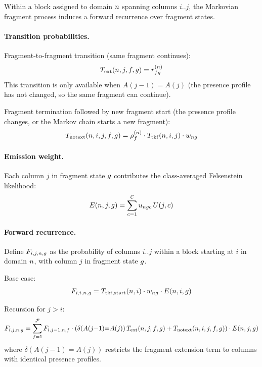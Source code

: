 Within a block assigned to domain $n$ spanning columns $i..j$, the
Markovian fragment process induces a forward recurrence over fragment
states.

\paragraph{Transition probabilities.}
Fragment-to-fragment transition (same fragment continues):
\[
T_{\mathrm{ext}}(n, j, f, g) = r^{(n)}_{fg}
\]
This transition is only available when $A(j{-}1) = A(j)$ (the presence
profile has not changed, so the same fragment can continue).

Fragment termination followed by new fragment start (the presence
profile changes, or the Markov chain starts a new fragment):
\[
T_{\mathrm{notext}}(n, i, j, f, g) = \rho^{(n)}_f \cdot T_{\mathrm{tkf}}(n, i, j) \cdot w_{ng}
\]

\paragraph{Emission weight.}
Each column $j$ in fragment state $g$ contributes the
class-averaged Felsenstein likelihood:
\[
E(n, j, g) = \sum_{c=1}^{\mathcal{C}} u_{ngc}\, U(j, c)
\]

\paragraph{Forward recurrence.}
Define $F_{i,j,n,g}$ as the probability of columns $i..j$
within a block starting at $i$ in domain $n$, with column $j$ in
fragment state $g$.

Base case:
\begin{equation}
F_{i,i,n,g} = T_{\mathrm{tkf,start}}(n, i) \cdot w_{ng} \cdot E(n, i, g)
\label{eq:intra-forward-base}
\end{equation}

Recursion for $j > i$:
\begin{equation}
F_{i,j,n,g} = \sum_{f=1}^{\mathcal{F}} F_{i,j{-}1,n,f} \cdot
\left(
  \delta(A(j{-}1){=}A(j))\, T_{\mathrm{ext}}(n, j, f, g)
  + T_{\mathrm{notext}}(n, i, j, f, g)
\right) \cdot E(n, j, g)
\label{eq:intra-forward-recurse}
\end{equation}
where $\delta(A(j{-}1){=}A(j))$ restricts the fragment extension term to
columns with identical presence profiles.

